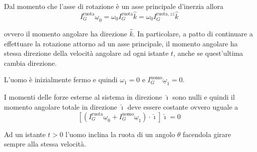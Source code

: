 \begin{example}{}
\begin{center}
\end{center}

Dal momento che l'asse di rotazione è un asse principale d'inerzia allora
\[
I_G^{\text{ruota}}\underline{\omega}_0=\omega_0 I_G^{\text{ruota}}\hat{k}=\omega_0 I_G^{\text{ruota},zz}\hat{k}
\]

ovvero il momento angolare ha direzione $\hat{k}$. In particolare, a patto di continuare a effettuare la rotazione attorno ad un asse principale, il momento angolare ha stessa direzione della velocità angolare ad ogni istante $t$, anche se quest'ultima cambia direzione.

L'uomo è inizialmente fermo e quindi $\omega_1=0$ e $I_G^{\text{uomo}}\underline{\omega}_1=0$.

I momenti delle forze esterne al sistema in direzione $\hat{\imath}$ sono nulli e quindi il momento angolare totale in direzione $\hat{\imath}$ deve essere costante ovvero uguale a
\[
\left[\left(I_G^{\text{ruota}}\underline{\omega}_0+I_G^{\text{uomo}}\underline{\omega}_1\right)\cdot\hat{\imath}\right]\hat{\imath}=0
\]

Ad un istante $t>0$ l'uomo inclina la ruota di un angolo $\theta$ facendola girare sempre alla stessa velocità.

\begin{center}
\end{center}
\end{example}
